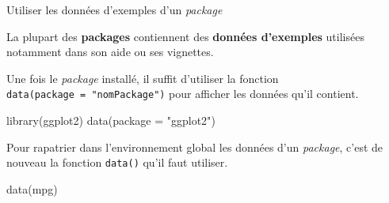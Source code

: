 \documentclass[12pt,ignorenonframetext,]{beamer}
\newenvironment{Shaded}{}{}
\newcommand{\KeywordTok}[1]{\textcolor[rgb]{0.00,0.00,1.00}{{#1}}}
\newcommand{\DataTypeTok}[1]{{#1}}
\newcommand{\StringTok}[1]{\textcolor[rgb]{0.00,0.50,0.50}{{#1}}}
\newcommand{\NormalTok}[1]{{#1}}
\renewenvironment{Shaded}{\begin{snugshade}}{\end{snugshade}}
\begin{document}
\begin{frame}[fragile]{Utiliser les données d'exemples d'un
\emph{package}}

La plupart des \textbf{packages} contiennent des \textbf{données
d'exemples} utilisées notamment dans son aide ou ses vignettes.

Une fois le \emph{package} installé, il suffit d'utiliser la fonction
\texttt{data(package\ =\ "nomPackage")} pour afficher les données qu'il
contient.

\begin{Shaded}
\begin{Highlighting}[]
\KeywordTok{library}\NormalTok{(ggplot2)}
\KeywordTok{data}\NormalTok{(}\DataTypeTok{package =} \StringTok{"ggplot2"}\NormalTok{)}
\end{Highlighting}
\end{Shaded}

\pause Pour \og rapatrier \fg{} dans l'environnement global les données
d'un \emph{package}, c'est de nouveau la fonction \texttt{data()} qu'il
faut utiliser.

\begin{Shaded}
\begin{Highlighting}[]
\KeywordTok{data}\NormalTok{(mpg)}
\end{Highlighting}
\end{Shaded}

\end{frame}
\end{document}
